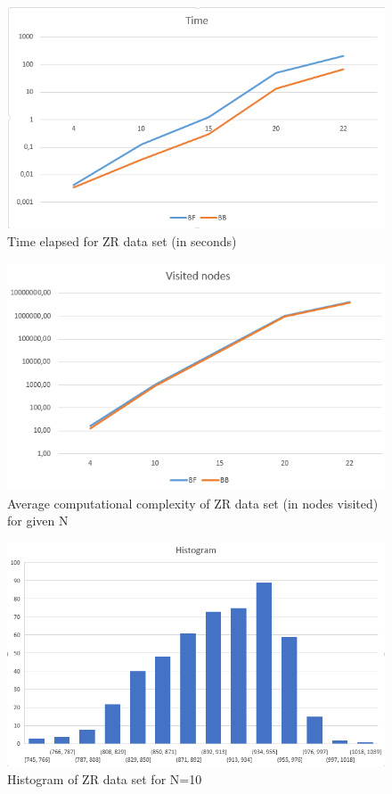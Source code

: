 \documentclass{article}
\begin{document}
\begin{figure}[H]
    \centering
    \includegraphics[width=0.8\linewidth]{ZRtime.PNG}
    \caption{Time elapsed for ZR data set (in seconds)}
\end{figure}
\begin{figure}[H]
    \centering
    \includegraphics[width=0.8\linewidth]{ZRpass.PNG}
    \caption{Average computational complexity of ZR data set (in nodes visited) for given N}
\end{figure}
\begin{figure}[H]
    \centering
    \includegraphics[width=0.8\linewidth]{ZRhistogram.PNG}
    \caption{Histogram of ZR data set for N=10 }
\end{figure}
\end{document}
